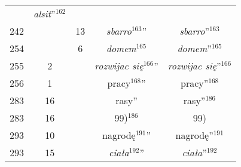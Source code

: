\documentclass[a4paper,11pt]{article}
\numberwithin{equation}{section}
\begin{document}
\begin{center}
\begin{tabular}{|c|c|c|c|c|}
    & \textit{alsit}”$^{ 162 }$ \\
    242 & & 13 & \textit{sbarro}$^{ 163 }$” & \textit{sbarro}”$^{ 163 }$ \\
    254 & & \hphantom{0}6
                              & \textit{domem}$^{ 165 }$
    & \textit{domem}”$^{ 165 }$ \\
    255 & \hphantom{0}2 & & \textit{rozwijac się}$^{ 166 }$”
           & \textit{rozwijac się}”$^{ 166 }$ \\
    256 & \hphantom{0}1 & & pracy$^{ 168 }$” & pracy”$^{ 168 }$ \\
    283 & 16 & & rasy” & rasy”$^{ 186 }$ \\
    283 & 16 & & 99)$^{ 186 }$ & 99) \\
    293 & 10 & & nagrodę$^{ 191 }$” & nagrodę”$^{ 191 }$ \\
    293 & 15 & & \textit{ciała}$^{ 192 }$” & \textit{ciała}”$^{ 192 }$ \\
    \hline
  \end{tabular}





  \newpage


\end{center}
\end{document}
